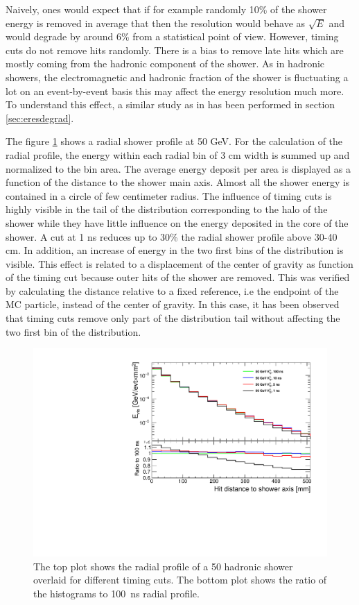 Naively, ones would expect that if for example randomly 10\% of the shower energy is removed in average that then the resolution would behave as $\sqrt{E}$ and would degrade by around 6\% from a statistical point of view. However, timing cuts do not remove hits randomly. There is a bias to remove late hits which are mostly coming from the hadronic component of the shower. As in hadronic showers, the electromagnetic and hadronic fraction of the shower is fluctuating a lot on an event-by-event basis this may affect the energy resolution much more. To understand this effect, a similar study as in \cite{SoftCompNew2012} has been performed in section \ref{sec:eresdegrad}.

The figure \ref{fig:RadialProfNoSmearing} shows a \kzeroL{} radial shower profile at 50 GeV. For the calculation of the radial profile, the energy within each radial bin of 3 cm width is summed up and normalized to the bin area. The average energy deposit per area is displayed as a function of the distance to the shower main axis. Almost all the shower energy is contained in a circle of few centimeter radius. The influence of timing cuts is highly visible in the tail of the distribution corresponding to the halo of the shower while they have little influence on the energy deposited in the core of the shower. A cut at 1 ns reduces up to 30\% the radial shower profile above 30-40 cm. In addition, an increase of energy in the two first bins of the distribution is visible. This effect is related to a displacement of the center of gravity as function of the timing cut because outer hits of the shower are removed. This was verified by calculating the distance relative to a fixed reference, i.e the endpoint of the MC particle, instead of the center of gravity. In this case, it has been observed that timing cuts remove only part of the distribution tail without affecting the two first bin of the distribution.

\begin{figure}[htbp!]
  \centering
  \includegraphics[width=0.6\linewidth]{../Thesis_Plots/ILD/NoSmearing/Plots/RadialProfileOverlay_noSmearing}
  \caption{The top plot shows the radial profile of a 50 \GeV hadronic shower overlaid for different timing cuts. The bottom plot shows the ratio of the histograms to \SI{100}{\nano\second} radial profile.} \label{fig:RadialProfNoSmearing}
\end{figure}

